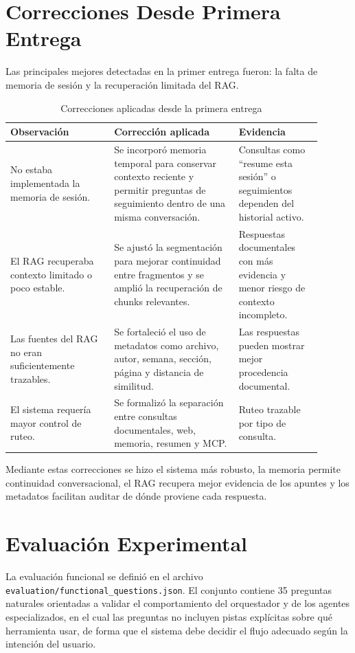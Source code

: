 \documentclass[conference]{IEEEtran}
\begin{document}
\section{Correcciones Desde Primera Entrega}

Las principales mejores detectadas en la primer entrega fueron: la falta de memoria de sesión y la recuperación limitada del RAG.

\begin{table}[!t]
\caption{Correcciones aplicadas desde la primera entrega}
\label{tab:correcciones-primera-entrega}
\centering
\begin{tabular}{p{0.30\linewidth} p{0.36\linewidth} p{0.24\linewidth}}
\hline 
\textbf{Observación} & \textbf{Corrección aplicada} & \textbf{Evidencia} \\
\hline
No estaba implementada la memoria de sesión. & Se incorporó memoria temporal para conservar contexto reciente y permitir preguntas de seguimiento dentro de una misma conversación. & Consultas como ``resume esta sesión'' o seguimientos dependen del historial activo. \\
El RAG recuperaba contexto limitado o poco estable. & Se ajustó la segmentación para mejorar continuidad entre fragmentos y se amplió la recuperación de chunks relevantes. & Respuestas documentales con más evidencia y menor riesgo de contexto incompleto. \\
Las fuentes del RAG no eran suficientemente trazables. & Se fortaleció el uso de metadatos como archivo, autor, semana, sección, página y distancia de similitud. & Las respuestas pueden mostrar mejor procedencia documental. \\
El sistema requería mayor control de ruteo. & Se formalizó la separación entre consultas documentales, web, memoria, resumen y MCP. & Ruteo trazable por tipo de consulta. \\
\hline
\end{tabular}
\end{table}

Mediante estas correcciones se hizo el sistema más robusto, la memoria permite continuidad conversacional, el RAG recupera mejor evidencia de los apuntes y los metadatos facilitan auditar de dónde proviene cada respuesta.

\section{Evaluación Experimental} 

La evaluación funcional se definió en el archivo \texttt{evaluation/functional\_questions.json}. El conjunto contiene 35 preguntas naturales orientadas a validar el comportamiento del orquestador y de los agentes especializados, en el cual las preguntas no incluyen pistas explícitas sobre qué herramienta usar, de forma que el sistema debe decidir el flujo adecuado según la intención del usuario.
\end{document}
